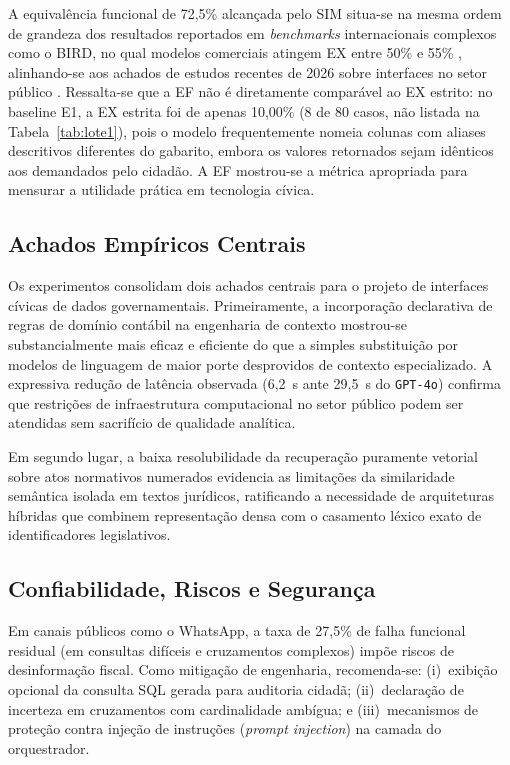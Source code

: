\documentclass[12pt]{article}
\begin{document}
A equivalência funcional de 72,5\% alcançada pelo SIM situa-se na mesma ordem de grandeza dos resultados reportados em \textit{benchmarks} internacionais complexos como o BIRD, no qual modelos comerciais atingem EX entre 50\% e 55\% \cite{Li2024BIRD}, alinhando-se aos achados de estudos recentes de 2026 sobre interfaces no setor público \cite{Zheng2026GovLLM}. Ressalta-se que a EF não é diretamente comparável ao EX estrito: no baseline E1, a EX estrita foi de apenas 10,00\% (8 de 80 casos, não listada na Tabela~\ref{tab:lote1}), pois o modelo frequentemente nomeia colunas com aliases descritivos diferentes do gabarito, embora os valores retornados sejam idênticos aos demandados pelo cidadão. A EF mostrou-se a métrica apropriada para mensurar a utilidade prática em tecnologia cívica.

\subsection{Achados Empíricos Centrais}

Os experimentos consolidam dois achados centrais para o projeto de interfaces cívicas de dados governamentais. Primeiramente, a incorporação declarativa de regras de domínio contábil na engenharia de contexto mostrou-se substancialmente mais eficaz e eficiente do que a simples substituição por modelos de linguagem de maior porte desprovidos de contexto especializado. A expressiva redução de latência observada (6,2~s ante 29,5~s do \texttt{GPT-4o}) confirma que restrições de infraestrutura computacional no setor público podem ser atendidas sem sacrifício de qualidade analítica.

Em segundo lugar, a baixa resolubilidade da recuperação puramente vetorial sobre atos normativos numerados evidencia as limitações da similaridade semântica isolada em textos jurídicos, ratificando a necessidade de arquiteturas híbridas que combinem representação densa com o casamento léxico exato de identificadores legislativos.

\subsection{Confiabilidade, Riscos e Segurança}

Em canais públicos como o WhatsApp, a taxa de 27,5\% de falha funcional residual (em consultas difíceis e cruzamentos complexos) impõe riscos de desinformação fiscal. Como mitigação de engenharia, recomenda-se: (i)~exibição opcional da consulta SQL gerada para auditoria cidadã; (ii)~declaração de incerteza em cruzamentos com cardinalidade ambígua; e (iii)~mecanismos de proteção contra injeção de instruções (\textit{prompt injection}) na camada do orquestrador.
\end{document}
